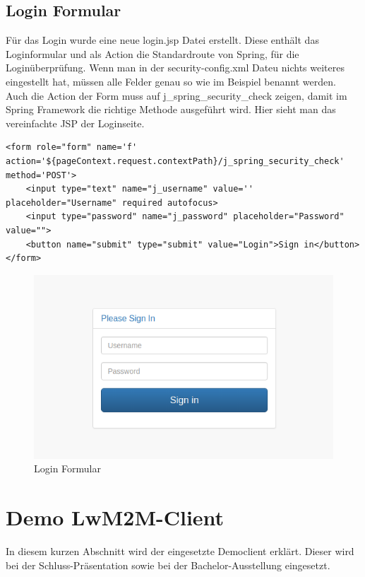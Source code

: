 \subsection{Login Formular}
Für das Login wurde eine neue login.jsp Datei erstellt. Diese enthält das Loginformular und als Action die Standardroute von Spring, für die Loginüberprüfung. Wenn man in der security-config.xml Dateu nichts weiteres eingestellt hat, müssen alle Felder genau so wie im Beispiel benannt werden. Auch die Action der Form muss auf j\_spring\_security\_check zeigen, damit im Spring Framework die richtige Methode ausgeführt wird. Hier sieht man das vereinfachte JSP der Loginseite.
\begin{lstlisting}[language=html5]
<form role="form" name='f' action='${pageContext.request.contextPath}/j_spring_security_check' method='POST'>
	<input type="text" name="j_username" value='' placeholder="Username" required autofocus>
	<input type="password" name="j_password" placeholder="Password" value="">
	<button name="submit" type="submit" value="Login">Sign in</button>
</form>
\end{lstlisting}

\begin{figure}[H]
\centering
\includegraphics[scale=0.5]{../04_Realisierung/images/loginform.png}
\caption{Login Formular}
\end{figure}

\newpage

\section{Demo LwM2M-Client}
In diesem kurzen Abschnitt wird der eingesetzte Democlient erklärt. Dieser wird bei der Schluss-Präsentation sowie bei der Bachelor-Ausstellung eingesetzt.
